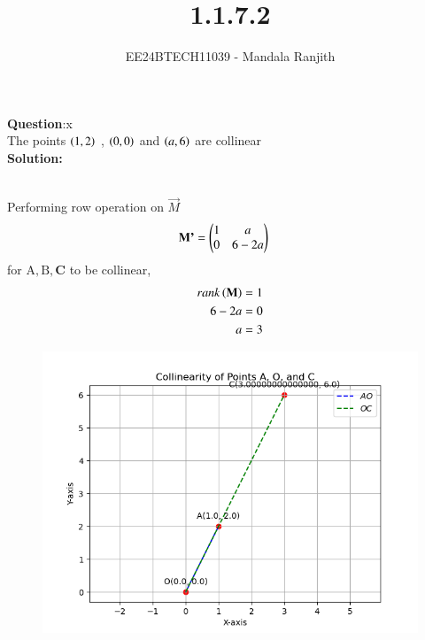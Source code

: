 \documentclass[journal]{IEEEtran}
\begin{document}

\vspace{3cm}

\title{1.1.7.2}
\author{EE24BTECH11039 - Mandala Ranjith
}
{\let\newpage\relax\maketitle}

\renewcommand{\thefigure}{\theenumi}
\renewcommand{\thetable}{\theenumi}
\setlength{\intextsep}{10pt} %


\renewcommand{\thetable}{\theenumi}


\textbf{Question}:x\\
The points $\left(1,2\right)$ , $\left(0,0\right)$ and $\left(a,6\right)$ are collinear
\\ \textbf{Solution: }\\
    \begin{table}[h!]    
      \centering
      
      \caption{}
    \end{table}\\
    Performing row operation on $\vec{M}$ \\
\begin{align}
	\textbf{M'} &=  \begin{pmatrix}1 & a\\0 & 6-2a\end{pmatrix}
\end{align}
	for $\text{A},\text{B},\textbf{C}$ to be collinear,
\begin{align}
        rank\left(\mathbf{M}\right) & =1\\
	6-2a & =0\\
	a & =3
\end{align}
	
    \begin{figure}[h]
        \centering
       \includegraphics[width=0.7\linewidth]{./figs/fig1.png}
       \caption{}
       \label{graph}
    \end{figure}
\end{document}
